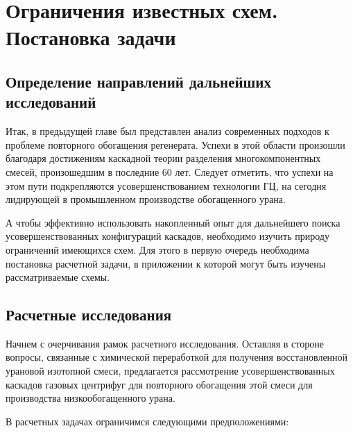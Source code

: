 \chapter{Ограничения известных схем. Постановка задачи}\label{ch:ch2}

\section{Определение направлений дальнейших исследований}
Итак, в предыдущей главе был представлен анализ современных подходов к проблеме повторного обогащения регенерата.
Успехи в этой области произошли благодаря достижениям каскадной теории разделения многокомпонентных смесей, произошедшим в последние 60 лет.
Следует отметить, что успехи на этом пути подкрепляются усовершенствованием технологии ГЦ, на сегодня лидирующей в промышленном производстве обогащенного урана.

А чтобы эффективно использовать накопленный опыт для дальнейшего поиска усовершенствованных конфигураций каскадов, необходимо изучить природу ограничений имеющихся схем. Для этого в первую очередь необходима постановка расчетной задачи, в приложении к которой могут быть изучены рассматриваемые схемы.

\section{Расчетные исследования}

Начнем с очерчивания рамок расчетного исследования.
Оставляя в стороне вопросы, связанные с химической переработкой для получения восстановленной урановой изотопной смеси, предлагается рассмотрение усовершенствованных каскадов газовых центрифуг для повторного обогащения этой смеси для производства низкообогащенного урана. 

В расчетных задачах ограничимся следующими предположениями:

